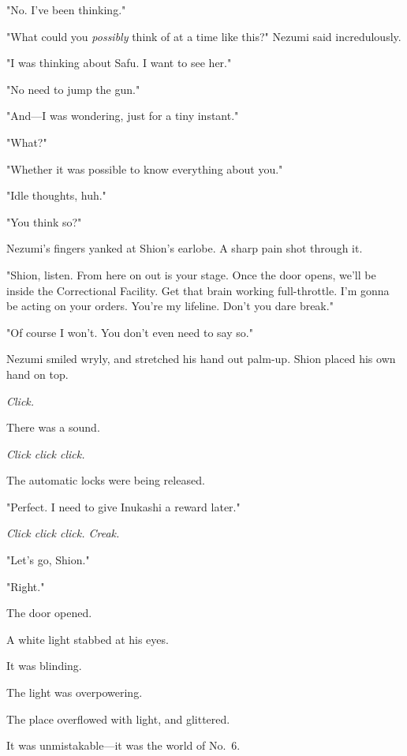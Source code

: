 "No. I've been thinking."

"What could you \emph{possibly} think of at a time like this?" Nezumi said
incredulously.

"I was thinking about Safu. I want to see her."

"No need to jump the gun."

"And---I was wondering, just for a tiny instant."

"What?"

"Whether it was possible to know everything about you."

"Idle thoughts, huh."

"You think so?"

Nezumi's fingers yanked at Shion's earlobe. A sharp pain shot through
it.

"Shion, listen. From here on out is your stage. Once the door opens,
we'll be inside the Correctional Facility. Get that brain working
full-throttle. I'm gonna be acting on your orders. You're my lifeline.
Don't you dare break."

"Of course I won't. You don't even need to say so."

Nezumi smiled wryly, and stretched his hand out palm-up. Shion placed
his own hand on top.

\emph{Click.}

There was a sound.

\emph{Click click click.}

The automatic locks were being released.

"Perfect. I need to give Inukashi a reward later."

\emph{Click click click. Creak.}

"Let's go, Shion."

"Right."

The door opened.

A white light stabbed at his eyes.

It was blinding.

The light was overpowering.

The place overflowed with light, and glittered.

It was unmistakable---it was the world of No.~6.